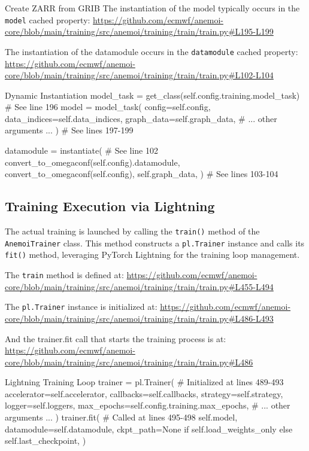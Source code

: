 \begin{codeonly}{Create ZARR from GRIB}
The instantiation of the model typically occurs in the \texttt{model} cached property:
\url{https://github.com/ecmwf/anemoi-core/blob/main/training/src/anemoi/training/train/train.py#L195-L199}

The instantiation of the datamodule occurs in the \texttt{datamodule} cached property:
\url{https://github.com/ecmwf/anemoi-core/blob/main/training/src/anemoi/training/train/train.py#L102-L104}

\begin{codeonly}{Dynamic Instantiation}
model_task = get_class(self.config.training.model_task) # See line 196
model = model_task(
   config=self.config,
   data_indices=self.data_indices,
   graph_data=self.graph_data,
   # ... other arguments ...
) # See lines 197-199

datamodule = instantiate( # See line 102
   convert_to_omegaconf(self.config).datamodule,
   convert_to_omegaconf(self.config),
   self.graph_data,
) # See lines 103-104
\end{codeonly}

%
\subsection{Training Execution via Lightning}

The actual training is launched by calling the \texttt{train()} method of the \texttt{AnemoiTrainer} class. This method constructs a \texttt{pl.Trainer} instance and calls its \texttt{fit()} method, leveraging PyTorch Lightning for the training loop management.

The \texttt{train} method is defined at:
\url{https://github.com/ecmwf/anemoi-core/blob/main/training/src/anemoi/training/train/train.py#L455-L494}

The \texttt{pl.Trainer} instance is initialized at:
\url{https://github.com/ecmwf/anemoi-core/blob/main/training/src/anemoi/training/train/train.py#L486-L493}

And the trainer.fit call that starts the training process is at:
\url{https://github.com/ecmwf/anemoi-core/blob/main/training/src/anemoi/training/train/train.py#L486}

\begin{codeonly}{Lightning Training Loop}
trainer = pl.Trainer( # Initialized at lines 489-493
	accelerator=self.accelerator,
	callbacks=self.callbacks,
	strategy=self.strategy,
	logger=self.loggers,
	max_epochs=self.config.training.max_epochs,
	# ... other arguments ...
)
trainer.fit( # Called at lines 495-498
	self.model,
	datamodule=self.datamodule,
	ckpt_path=None if self.load_weights_only else self.last_checkpoint,
)
\end{codeonly}


\end{codeonly}
